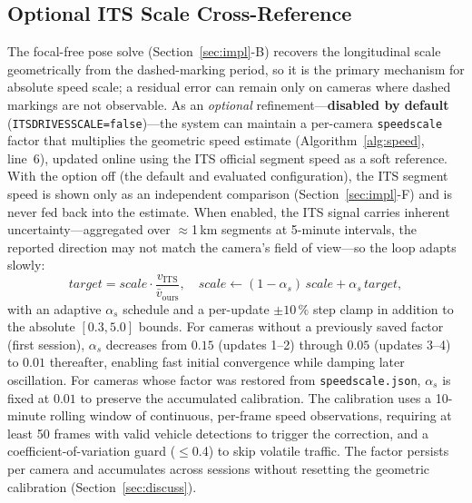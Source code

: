 \documentclass[conference]{IEEEtran}
\renewcommand{\_}{\textunderscore\allowbreak}
\begin{document}
\subsection{Optional ITS Scale Cross-Reference}
The focal-free pose solve (Section~\ref{sec:impl}-B) recovers the longitudinal scale
geometrically from the dashed-marking period, so it is the primary mechanism for absolute
speed scale; a residual error can remain only on cameras where dashed markings are not
observable. As an \emph{optional} refinement---\textbf{disabled by default}
(\texttt{ITS\_DRIVES\_SCALE=false})---the system can maintain a per-camera
\texttt{speed\_scale} factor that multiplies the geometric speed estimate
(Algorithm~\ref{alg:speed}, line~6), updated online using the ITS official segment speed as
a soft reference. With the option off (the default and evaluated configuration), the ITS
segment speed is shown only as an independent comparison (Section~\ref{sec:impl}-F) and is
never fed back into the estimate. When enabled, the ITS signal carries inherent
uncertainty---aggregated over $\approx$1\,km segments at 5-minute intervals, the
reported direction may not match the camera's field of view---so the loop adapts
slowly:
\begin{equation}
\textit{target} = \textit{scale}\cdot \frac{v_\text{ITS}}{\bar v_\text{ours}},\quad
\textit{scale} \gets (1{-}\alpha_s)\,\textit{scale} + \alpha_s\,\textit{target},
\end{equation}
with an adaptive $\alpha_s$ schedule and a per-update $\pm10\,\%$ step clamp in addition to the absolute $[0.3,5.0]$ bounds.
For cameras without a previously saved factor (first session), $\alpha_s$ decreases from $0.15$ (updates 1--2) through $0.05$ (updates 3--4) to $0.01$ thereafter, enabling fast initial convergence while damping later oscillation.
For cameras whose factor was restored from \texttt{speed\_scale.json}, $\alpha_s$ is fixed at $0.01$ to preserve the accumulated calibration.
The calibration uses a 10-minute rolling window of continuous, per-frame speed observations, requiring at least 50 frames with valid vehicle detections to trigger the correction, and a coefficient-of-variation guard ($\le$0.4) to skip volatile traffic.
The factor persists per camera and accumulates across sessions without resetting the geometric calibration (Section~\ref{sec:discuss}).
\end{document}
